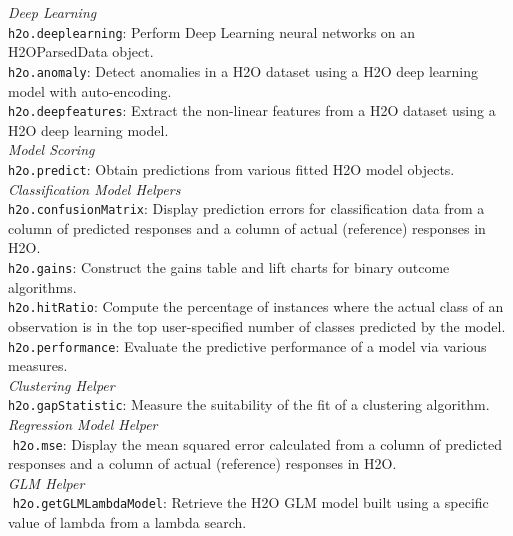 \documentclass[11pt]{article}
\begin{document}
\begin{enumerate}
{\textit{Deep Learning}\\

{\texttt{h2o.deeplearning}}: Perform Deep Learning neural networks on an H2OParsedData object.\\
{\texttt{h2o.anomaly}}: Detect anomalies in a H2O dataset using a H2O deep learning model with auto-encoding.\\
{\texttt{h2o.deepfeatures}}: Extract the non-linear features from a H2O dataset using a H2O deep learning model.\\

\textit{Model Scoring}\\

{\texttt{h2o.predict}}: Obtain predictions from various fitted H2O model objects.\\

\textit{Classification Model Helpers}\\

{\texttt{h2o.confusionMatrix}}: Display prediction errors for classification data from a column of predicted responses and a column of actual (reference) responses in H2O.\\
{\texttt{h2o.gains}}: Construct the gains table and lift charts for binary outcome algorithms.\\
{\texttt{h2o.hitRatio}}: Compute the percentage of instances where the actual class of an observation is in the top user-specified number of classes predicted by the model.\\
{\texttt{h2o.performance}}: Evaluate the predictive performance of a model via various measures.\\

\textit{Clustering Helper}\\

{\texttt{h2o.gapStatistic}}: Measure the suitability of the fit of a clustering algorithm. \\

\textit{Regression Model Helper}\\

 {\texttt{h2o.mse}}: Display the mean squared error calculated from a column of predicted responses and a column of actual (reference) responses in H2O.\\

\textit{GLM Helper}\\
 {\texttt{h2o.getGLMLambdaModel}}: Retrieve the H2O GLM model built using a specific value of lambda from a lambda search.\\

}
\end{enumerate}
\end{document}
